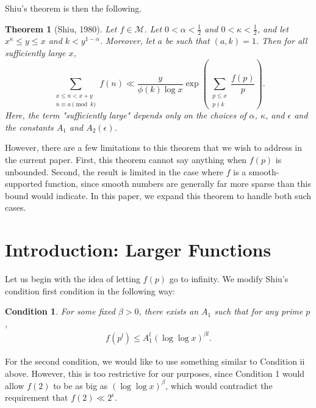 \documentclass{amsart}
\newtheorem{theorem}{Theorem}[section]
\newtheorem{cond}{Condition}
\begin{document}
Shiu's theorem is then the following.

\begin{theorem}[Shiu, 1980]\label{shiu}
Let $f\in \mathcal M$.  Let $0<\alpha<\frac 12$ and $0<\kappa<\frac 12$, and let $x^\kappa\leq y\leq x$ and $k<y^{1-\alpha}$.  Moreover, let $a$ be such that $(a,k)=1$.  Then for all sufficiently large $x$,
$$\sum_{\substack{x\leq n<x+y \\ n\equiv a\pmod k}}f(n)\ll \frac{y}{\phi(k)\log x}\exp\left(\sum_{\substack{p\leq x\\ p\nmid k}}\frac{f(p)}{p}\right).$$
Here, the term "sufficiently large" depends only on the choices of $\alpha$, $\kappa$, and $\epsilon$ and the constants $A_1$ and $A_2(\epsilon)$.
\end{theorem}


However, there are a few limitations to this theorem that we wish to address in the current paper.  First, this theorem cannot say anything when $f(p)$ is unbounded.  Second, the result is limited in the case where $f$ is a smooth-supported function, since smooth numbers are generally far more sparse than this bound would indicate.  In this paper, we expand this theorem to handle both such cases.

\section{Introduction: Larger Functions}

Let us begin with the idea of letting $f(p)$ go to infinity.  We modify Shiu's condition first condition in the following way:  
\begin{cond}\label{Condition1}
For some fixed $\beta>0$, there exists an $A_1$ such that for any prime $p$,
\begin{gather}\label{Cond1}
f(p^l)\leq A_1^l (\log\log x)^{\beta l}.
\end{gather}
\end{cond}
For the second condition, we would like to use something similar to Condition ii above.  However, this is too restrictive for our purposes, since Condition 1 would allow $f(2)$ to be as big as $(\log\log x)^{\beta}$, which would contradict the requirement that $f(2)\ll 2^\epsilon$. 
\end{document}
